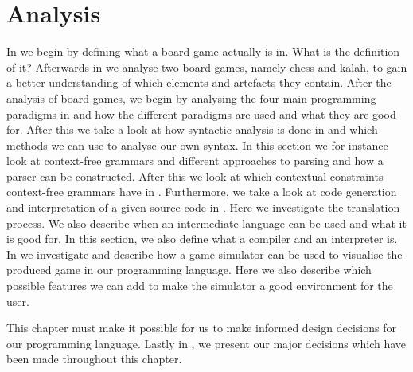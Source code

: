 \chapter{Analysis}
\label{chap:analysis}

In  we begin by defining what a board game
actually is in.  What is the definition of it? Afterwards in
 we analyse two board games, namely chess and kalah,
to gain a better understanding of which elements and artefacts they contain. 
After the analysis of board games, we begin by analysing the four main
programming paradigms in  and how the different paradigms
are used and what they are good for. After this we take a look at how syntactic analysis is done in
 and which methods we can use to analyse our own
syntax. In this section we for instance look at context-free grammars and
different approaches to parsing and how a parser can be constructed. After this
we look at which contextual constraints context-free grammars have in
. Furthermore, we take a look at code generation and interpretation of a given
source code in . Here we investigate
the translation process. We also describe when an intermediate language can be
used and what it is good for. In this section, we also define what a compiler
and an interpreter is. In  we investigate and describe how a game simulator can
be used to visualise the produced game in our programming language. Here we also
describe which possible features we can add to make the simulator a good
environment for the user. 

This chapter must make it possible for us to make informed design decisions for
our programming language. Lastly in , we present
our major decisions which have been made throughout this chapter.









